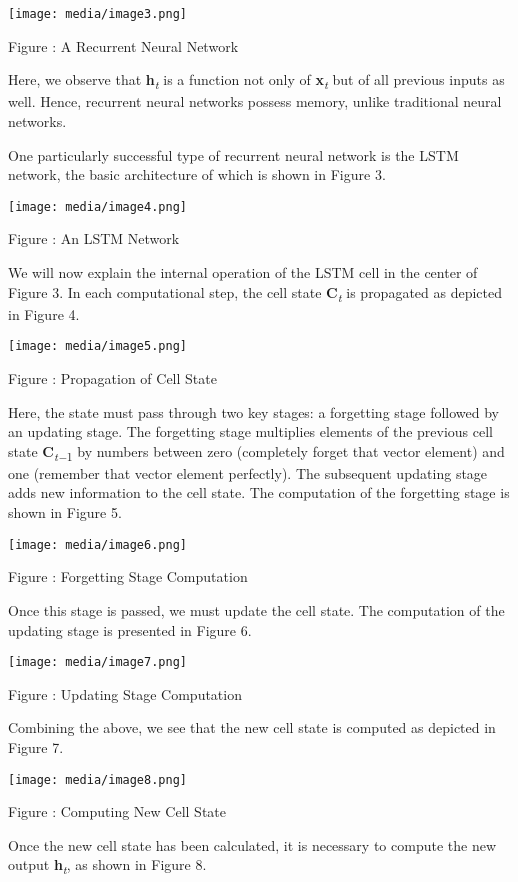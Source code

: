 \documentclass[
]{article}
\begin{document}
\texttt{[image: media/image3.png]}

Figure : A Recurrent Neural Network

Here, we observe that \textbf{h}\emph{\textsubscript{t}} is a function
not only of \textbf{x}\emph{\textsubscript{t}} but of all previous
inputs as well. Hence, recurrent neural networks possess memory, unlike
traditional neural networks.

One particularly successful type of recurrent neural network is the LSTM
network, the basic architecture of which is shown in Figure 3.

\texttt{[image: media/image4.png]}

Figure : An LSTM Network

We will now explain the internal operation of the LSTM cell in the
center of Figure 3. In each computational step, the cell state
\textbf{C}\emph{\textsubscript{t}} is propagated as depicted in Figure
4.

\texttt{[image: media/image5.png]}

Figure : Propagation of Cell State

Here, the state must pass through two key stages: a forgetting stage
followed by an updating stage. The forgetting stage multiplies elements
of the previous cell state \textbf{C}\textsubscript{\emph{t−}1} by
numbers between zero (completely forget that vector element) and one
(remember that vector element perfectly). The subsequent updating stage
adds new information to the cell state. The computation of the
forgetting stage is shown in Figure 5.

\texttt{[image: media/image6.png]}

Figure : Forgetting Stage Computation

Once this stage is passed, we must update the cell state. The
computation of the updating stage is presented in Figure 6.

\texttt{[image: media/image7.png]}

Figure : Updating Stage Computation

Combining the above, we see that the new cell state is computed as
depicted in Figure 7.

\texttt{[image: media/image8.png]}

Figure : Computing New Cell State

Once the new cell state has been calculated, it is necessary to compute
the new output \textbf{h}\emph{\textsubscript{t}}, as shown in Figure 8.
\end{document}
